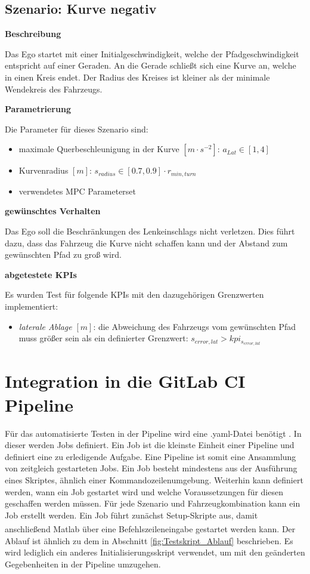 \subsection{Szenario: Kurve negativ} \label{subsec:kurveNegativ}
\textbf{Beschreibung}

\noindent Das Ego startet mit einer Initialgeschwindigkeit, welche der Pfadgeschwindigkeit entspricht auf einer Geraden. An die Gerade schließt sich eine Kurve an, welche in einen Kreis endet. Der Radius des Kreises ist kleiner als der minimale Wendekreis des Fahrzeugs. 

\bigskip\noindent\textbf{Parametrierung}

\noindent Die Parameter für dieses Szenario sind:
\begin{itemize}
    \item maximale Querbeschleunigung in der Kurve $[m\cdot s^{-2}]$: $a_{Lat} \in [1,4]$
    \item Kurvenradius $[m]$: $s_{radius} \in [0.7,0.9]\cdot r_{min,turn}$
    \item verwendetes MPC Parameterset
\end{itemize}

\bigskip\noindent\textbf{gewünschtes Verhalten}

\noindent Das Ego soll die Beschränkungen des Lenkeinschlags nicht verletzen. Dies führt dazu, dass das Fahrzeug die Kurve nicht schaffen kann und der Abstand zum gewünschten Pfad zu groß wird.

\bigskip\noindent\textbf{abgetestete KPIs}

\noindent Es wurden Test für folgende KPIs mit den dazugehörigen Grenzwerten implementiert:
\begin{itemize}
    \item \textit{laterale Ablage} $[m]$: die Abweichung des Fahrzeugs vom gewünschten Pfad muss größer sein als ein definierter Grenzwert: $s_{error,lat} > kpi_{s_{error,lat}}$
\end{itemize}



\section{Integration in die GitLab CI Pipeline} \label{sec:CIPipeline}
Für das automatisierte Testen in der Pipeline wird eine .yaml-Datei benötigt \cite{GitLabDoks}. In dieser werden Jobs definiert. Ein Job ist die kleinste Einheit einer Pipeline und definiert eine zu erledigende Aufgabe. Eine Pipeline ist somit eine Ansammlung von zeitgleich gestarteten Jobs. Ein Job besteht mindestens aus der Ausführung eines Skriptes, ähnlich einer Kommandozeilenumgebung. Weiterhin kann definiert werden, wann ein Job gestartet wird und welche Voraussetzungen für diesen geschaffen werden müssen.
Für jede Szenario und Fahrzeugkombination kann ein Job erstellt werden. Ein Job führt zunächst Setup-Skripte aus, damit anschließend Matlab\textsuperscript{\textregistered} über eine Befehlszeileneingabe gestartet werden kann. Der Ablauf ist ähnlich zu dem in Abschnitt \ref{fig:Testskript_Ablauf} beschrieben. Es wird lediglich ein anderes Initialisierungsskript verwendet, um mit den geänderten Gegebenheiten in der Pipeline umzugehen.

